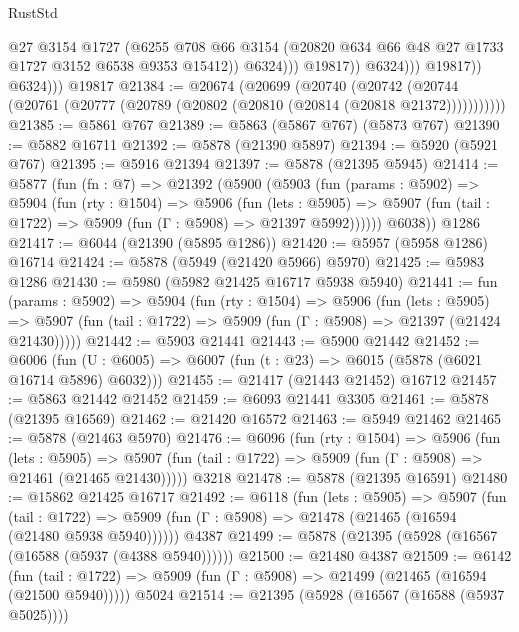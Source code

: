 \begin{lexlean}{RustStd}
\begin{coremodule}
                              @27
                              @3154
                              @1727
                              (@6255
                                @708
                                @66
                                @3154
                                (@20820 @634 @66 @48 @27 @1733 @1727 @3152 @6538 @9353 @15412))
                              @6324)))
                        @19817))
                    @6324)))
              @19817))
          @6324)))
    @19817
@21384 := @20674
    (@20699
      (@20740
        (@20742 (@20744 (@20761 (@20777 (@20789 (@20802 (@20810 (@20814 (@20818 @21372)))))))))))
@21385 := @5861 @767
@21389 := @5863 (@5867 @767) (@5873 @767)
@21390 := @5882 @16711
@21392 := @5878 (@21390 @5897)
@21394 := @5920 (@5921 @767)
@21395 := @5916 @21394
@21397 := @5878 (@21395 @5945)
@21414 := @5877
    (fun (fn : @7) =>
    @21392
      (@5900
        (@5903
          (fun (params : @5902) =>
          @5904
            (fun (rty : @1504) =>
            @5906
              (fun (lets : @5905) =>
              @5907 (fun (tail : @1722) => @5909 (fun (Γ : @5908) => @21397 @5992))))))
        @6038))
    @1286
@21417 := @6044 (@21390 (@5895 @1286))
@21420 := @5957 (@5958 @1286) @16714
@21424 := @5878 (@5949 (@21420 @5966) @5970)
@21425 := @5983 @1286
@21430 := @5980 (@5982 @21425 @16717 @5938 @5940)
@21441 := fun (params : @5902) =>
  @5904
    (fun (rty : @1504) =>
    @5906
      (fun (lets : @5905) =>
      @5907 (fun (tail : @1722) => @5909 (fun (Γ : @5908) => @21397 (@21424 @21430)))))
@21442 := @5903 @21441
@21443 := @5900 @21442
@21452 := @6006
    (fun (U : @6005) => @6007 (fun (t : @23) => @6015 (@5878 (@6021 @16714 @5896) @6032)))
@21455 := @21417 (@21443 @21452) @16712
@21457 := @5863 @21442 @21452
@21459 := @6093 @21441 @3305
@21461 := @5878 (@21395 @16569)
@21462 := @21420 @16572
@21463 := @5949 @21462
@21465 := @5878 (@21463 @5970)
@21476 := @6096
    (fun (rty : @1504) =>
    @5906
      (fun (lets : @5905) =>
      @5907 (fun (tail : @1722) => @5909 (fun (Γ : @5908) => @21461 (@21465 @21430)))))
    @3218
@21478 := @5878 (@21395 @16591)
@21480 := @15862 @21425 @16717
@21492 := @6118
    (fun (lets : @5905) =>
    @5907
      (fun (tail : @1722) =>
      @5909 (fun (Γ : @5908) => @21478 (@21465 (@16594 (@21480 @5938 @5940))))))
    @4387
@21499 := @5878 (@21395 (@5928 (@16567 (@16588 (@5937 (@4388 @5940))))))
@21500 := @21480 @4387
@21509 := @6142
    (fun (tail : @1722) => @5909 (fun (Γ : @5908) => @21499 (@21465 (@16594 (@21500 @5940)))))
    @5024
@21514 := @21395 (@5928 (@16567 (@16588 (@5937 @5025))))

\end{coremodule}
\end{lexlean}
